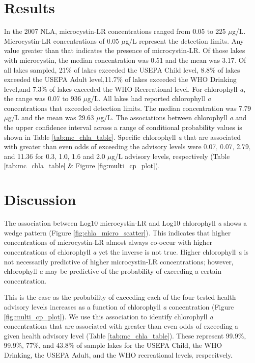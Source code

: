 \documentclass[11pt,]{article}
\begin{document}
\section{Results}\label{results}

In the 2007 NLA, microcystin-LR concentrations ranged from 0.05 to 225
\(\mu\)g/L. Microcystin-LR concentrations of 0.05 \(\mu\)g/L represent
the detection limits. Any value greater than that indicates the presence
of microcystin-LR. Of those lakes with microcystin, the median
concentration was 0.51 and the mean was 3.17. Of all lakes sampled, 21\%
of lakes exceeded the USEPA Child level, 8.8\% of lakes exceeded the
USEPA Adult level,11.7\% of lakes exceeded the WHO Drinking level,and
7.3\% of lakes exceeded the WHO Recreational level. For chlorophyll
\emph{a}, the range was 0.07 to 936 \(\mu\)g/L. All lakes had reported
chlorophyll \emph{a} concentrations that exceeded detection limits. The
median concentration was 7.79 \(\mu\)g/L and the mean was 29.63
\(\mu\)g/L. The associations between chlorophyll \emph{a} and the upper
confidence interval across a range of conditional probability values is
shown in Table \ref{tab:mc_chla_table}. Specific chlorophyll \emph{a}
that are associated with greater than even odds of exceeding the
advisory levels were 0.07, 0.07, 2.79, and 11.36 for 0.3, 1.0, 1.6 and
2.0 \(\mu\)g/L advisory levels, respectively (Table
\ref{tab:mc_chla_table} \& Figure \ref{fig:multi_cp_plot}).

\section{Discussion}\label{discussion}

The association between Log10 microcystin-LR and Log10 chlorophyll
\emph{a} shows a wedge pattern (Figure \ref{fig:chla_micro_scatter}).
This indicates that higher concentrations of microcystin-LR almost
always co-occur with higher concentrations of chlorophyll \emph{a} yet
the inverse is not true. Higher chlorophyll \emph{a} is not necessarily
predictive of higher microcystin-LR concentrations; however, chlorophyll
\emph{a} may be predictive of the probability of exceeding a certain
concentration.

This is the case as the probability of exceeding each of the four tested
health advisory levels increases as a function of chlorophyll \emph{a}
concentration (Figure \ref{fig:multi_cp_plot}). We use this association
to identify chlorophyll \emph{a} concentrations that are associated with
greater than even odds of exceeding a given health advisory level (Table
\ref{tab:mc_chla_table}). These represent 99.9\%, 99.9\%, 77\%, and
43.8\% of sample lakes for the USEPA Child, the WHO Drinking, the USEPA
Adult, and the WHO recreational levels, respecitvely.
\end{document}

